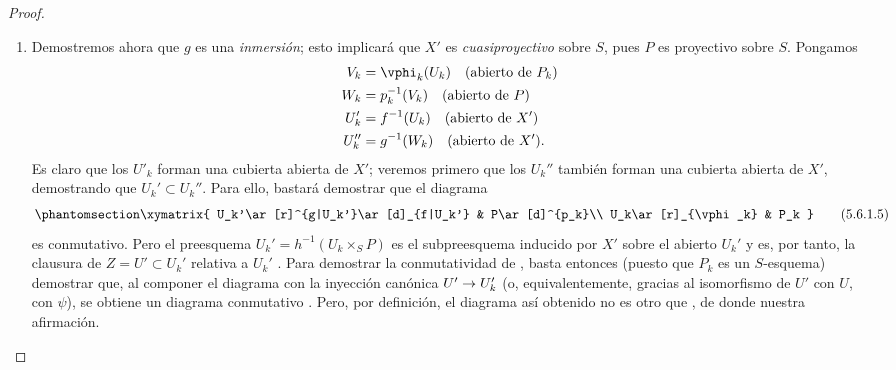 \documentclass[oneside,10pt]{amsart}
\makeatletter
\newcommand{\ega@arrow}[2]{\mathchoice{#1}{#2}{#2}{#2}}
\renewcommand{\to}{\ega@arrow{\longrightarrow}{\rightarrow}}
\let\EGAOriginalLabel\label
\renewcommand{\label}[1]{\phantomsection\EGAOriginalLabel{#1}}
\makeatother
\begin{document}
\begin{proof}
\begin{enumerate}
  \item[(D)] Demostremos ahora que $g$ es una \emph{inmersión}; esto implicará que $X'$ es \emph{cuasiproyectivo} sobre $S$, pues $P$ es proyectivo sobre $S$.
    Pongamos
    \begin{align*}
      V_k  &=\vphi_k(U_k) \quad(\text{abierto de }P_k)\\
      W_k  &=p_k^{-1}(V_k)\quad(\text{abierto de }P)\\
      U_k' &=f^{-1}(U_k)  \quad(\text{abierto de }X')\\
      U_k''&=g^{-1}(W_k)  \quad(\text{abierto de }X').
    \end{align*}
    Es claro que los $U'_k$ forman una cubierta abierta de $X'$; veremos primero que los $U_k''$ también forman una cubierta abierta de $X'$, demostrando que $U_k'\subset U_k''$.
    Para ello, bastará demostrar que el diagrama
    \[
    \label{II.5.6.1.5}
      \xymatrix{
        U_k'\ar[r]^{g|U_k'}\ar[d]_{f|U_k'} &
        P\ar[d]^{p_k}\\
        U_k\ar[r]_{\vphi_k} &
        P_k
      }
      \tag{5.6.1.5}
    \]
    es conmutativo.
    Pero el preesquema $U_k'=h^{-1}(U_k\times_S P)$ es el subpreesquema inducido por $X'$ sobre el abierto $U_k'$ y es, por tanto, la clausura de $Z=U'\subset U_k'$ relativa a $U_k'$ .
    Para demostrar la conmutatividad de , basta entonces (puesto que $P_k$ es un $S$-esquema) demostrar que, al componer el diagrama con la inyección canónica $U'\to U_k'$ (o, equivalentemente, gracias al isomorfismo de $U'$ con $U$, con $\psi$), se obtiene un diagrama conmutativo .
    Pero, por definición, el diagrama así obtenido no es otro que , de donde nuestra afirmación.


\end{enumerate}
\end{proof}
\end{document}
